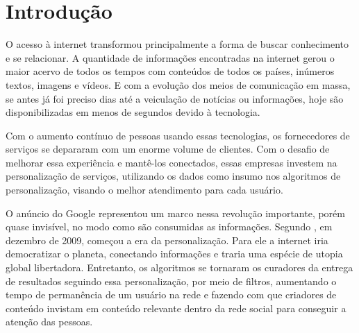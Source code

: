 \chapter{Introdução}


O acesso à internet transformou principalmente a forma de buscar conhecimento e se relacionar. A quantidade de informações encontradas na internet gerou o maior acervo de todos os tempos com conteúdos de todos os países, inúmeros textos, imagens e vídeos. E com a evolução dos meios de comunicação em massa, se antes já foi preciso dias até a veiculação de notícias ou informações, hoje são disponibilizadas em menos de segundos devido à tecnologia.

Com o aumento contínuo de pessoas usando essas tecnologias, os fornecedores de serviços se depararam com um enorme volume de clientes. Com o desafio de  melhorar essa experiência e mantê-los conectados, essas empresas investem na personalização de serviços, 
utilizando os dados como insumo nos algoritmos de personalização, visando o melhor atendimento para cada usuário.


O anúncio do Google representou um marco nessa revolução importante, porém quase invisível, no modo como são consumidas as informações. Segundo \cite{pariser2012}, em dezembro de 2009, começou a era da personalização. Para ele a internet iria democratizar o planeta, conectando informações e traria uma espécie de utopia global libertadora. Entretanto, os algoritmos se tornaram os curadores da entrega de resultados seguindo essa personalização, por meio de filtros, aumentando o tempo de permanência de um usuário na rede e fazendo com que criadores de conteúdo invistam em conteúdo relevante dentro da rede social para conseguir a atenção das pessoas.


